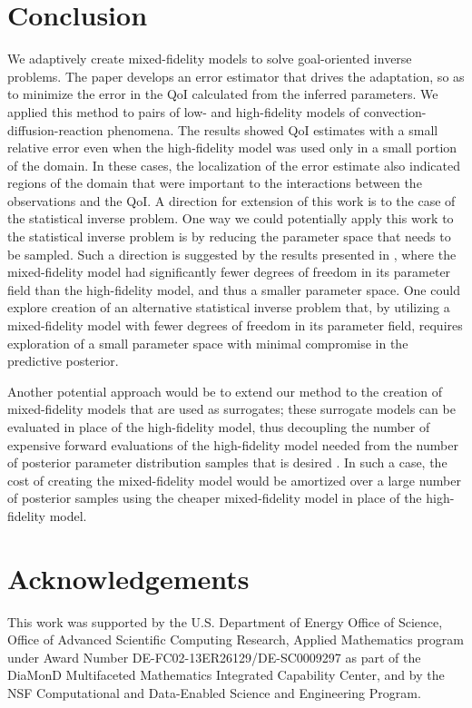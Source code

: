 \documentclass[review,sort&compress]{elsarticle}
\theoremstyle{plain} %
\theoremstyle{definition} %
\begin{document}
\section{Conclusion}\label{sec:conc}

We adaptively create mixed-fidelity models to solve goal-oriented inverse problems. The paper develops an error estimator that drives the adaptation, so as to minimize the error in the QoI calculated from the inferred parameters. We applied this method to pairs of low- and high-fidelity models of convection-diffusion-reaction phenomena. The results showed QoI estimates with a small relative error even when the high-fidelity model was used only in a small portion of the domain. In these cases, the localization of the error estimate also indicated regions of the domain that were important to the interactions between the observations and the QoI. A direction for extension of this work is to the case of the statistical inverse problem.  One way we could potentially apply this work to the statistical inverse problem is by reducing the parameter space that needs to be sampled. Such a direction is suggested by the results presented in , where the mixed-fidelity model had significantly fewer degrees of freedom in its parameter field than the high-fidelity model, and thus a smaller parameter space. One could explore creation of an alternative statistical inverse problem that, by utilizing a mixed-fidelity model with fewer degrees of freedom in its parameter field, requires exploration of a small parameter space with minimal compromise in the predictive posterior.

Another potential approach would be to extend our method to the creation of mixed-fidelity models that are used as surrogates; these surrogate models can be evaluated in place of the high-fidelity model, thus decoupling the number of expensive forward evaluations of the high-fidelity model needed from the number of posterior parameter distribution samples that is desired \cite{Con14}. In such a case, the cost of creating the mixed-fidelity model would be amortized over a large number of posterior samples using the cheaper mixed-fidelity model in place of the high-fidelity model.

\section*{Acknowledgements}

This work was supported by the U.S. Department of Energy Office of Science, Office of Advanced Scientific
Computing Research, Applied Mathematics program under Award Number DE-FC02-13ER26129/DE-SC0009297 as part of the
DiaMonD Multifaceted Mathematics Integrated Capability Center, and by the NSF Computational and Data-Enabled Science and Engineering Program.
\end{document}
